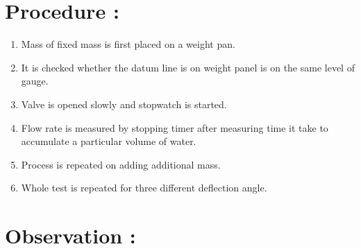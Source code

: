 \documentclass[12pt,a4paper]{article}
\begin{document}
\section{Procedure :}
\begin{enumerate}
    \item Mass of fixed mass is first placed on a weight pan.
    \item It is checked whether the datum line is on weight panel is on the same level of gauge.
    \item Valve is opened slowly and stopwatch is started.
    \item Flow rate is measured by stopping timer after measuring time it take to accumulate a particular volume of water.
    \item Process is repeated on adding additional mass.
    \item Whole test is repeated for three different deflection angle.
\end{enumerate}






\section{Observation :}
\end{document}
